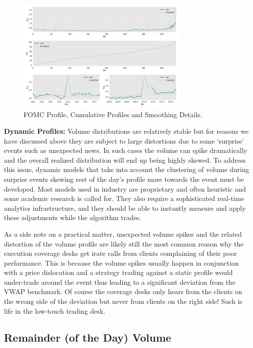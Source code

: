 	\begin{figure}[!ht]
	\centering
	\includegraphics[width=0.75\textwidth]{chapters/chapter_trade_data_models/figures/fomc_profile.png} 
	\caption{FOMC Profile, Cumulative Profiles and Smoothing Details. \label{fig:adv}}
\end{figure}


\noindent\textbf{Dynamic Profiles:} Volume distributions are relatively stable but for reasons we have discussed above they are subject to large distortions due to some `surprise' events such as unexpected news. In such cases the volume can spike dramatically and the overall realized distribution will end up being highly skewed. To address this issue, dynamic models that take into account the clustering of volume during surprise events skewing rest of the day's profile more towards the event must be developed. Most models used in industry are proprietary and often heuristic and some academic research is called for. They also require a sophisticated real-time analytics infrastructure, and they should be able to instantly measure and apply these adjustments while the algorithm trades.


As a side note on a practical matter, unexpected volume spikes and the related distortion of the volume profile are likely still the most common reason why the execution coverage desks get irate calls from clients complaining of their poor performance. This is because the volume spikes usually happen in conjunction with a price dislocation and a strategy trading against a static profile would under-trade around the event thus leading to a significant deviation from the VWAP benchmark. Of course the coverage desks only hears from the clients on the wrong side of the deviation but never from clients on the right side! Such is life in the low-touch trading desk. 



\subsection{Remainder (of the Day) Volume}

